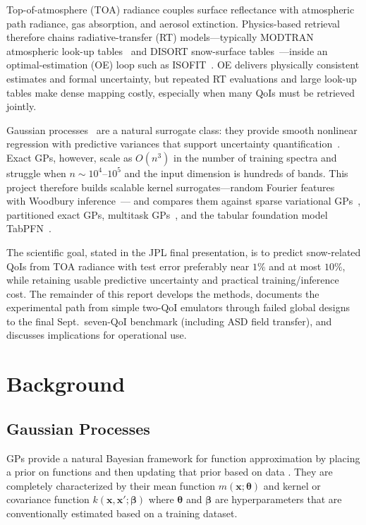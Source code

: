 \documentclass[11pt]{article}
\begin{document}
Top-of-atmosphere (TOA) radiance couples surface reflectance with atmospheric path
radiance, gas absorption, and aerosol extinction.
Physics-based retrieval therefore chains radiative-transfer (RT) models---typically
MODTRAN atmospheric look-up tables~\cite{berk2014modtran} and DISORT snow-surface
tables~\cite{stamnes1988disort}---inside an optimal-estimation (OE) loop such as
ISOFIT~\cite{thompson2018isofit}.
OE delivers physically consistent estimates and formal uncertainty, but repeated RT
evaluations and large look-up tables make dense mapping costly, especially when many
QoIs must be retrieved jointly.

Gaussian processes~\cite{rasmussen2006gp} are a natural surrogate class: they provide
smooth nonlinear regression with predictive variances that support uncertainty
quantification~\cite{abdar2021uq}.
Exact GPs, however, scale as $O(n^3)$ in the number of training spectra and struggle
when $n\sim10^4$--$10^5$ and the input dimension is hundreds of bands.
This project therefore builds scalable kernel surrogates---random Fourier
features~\cite{rahimi2007rff,yu2016orf} with Woodbury inference~\cite{cutajar2017dgp}---
and compares them against sparse variational GPs~\cite{hensman2013svgp}, partitioned
exact GPs, multitask GPs~\cite{bonilla2008mtgp,alvarez2012kernels}, and the tabular
foundation model TabPFN~\cite{Hollmann2025NatureTabPFN}.

The scientific goal, stated in the JPL final presentation, is to predict snow-related
QoIs from TOA radiance with test error preferably near $1\%$ and at most $10\%$, while
retaining usable predictive uncertainty and practical training/inference cost.
The remainder of this report develops the methods, documents the experimental path from
simple two-QoI emulators through failed global designs to the final Sept.\ seven-QoI
benchmark (including ASD field transfer), and discusses implications for operational
use.

\section{Background}
\label{sec:background}

\subsection{Gaussian Processes}
\label{sec:gps}
GPs provide a natural Bayesian framework for function approximation by placing a prior on functions and then updating that prior based on data \cite{RN332}. They are completely characterized by their mean function $\textit{m}(\boldsymbol{x}; \boldsymbol{\theta})$ and kernel or covariance function $\textit{k}(\boldsymbol{x}, \boldsymbol{x'}; \boldsymbol{\beta})$ where $\boldsymbol{\theta}$ and $\boldsymbol{\beta}$ are hyperparameters that are conventionally estimated based on a training dataset. 
\end{document}
